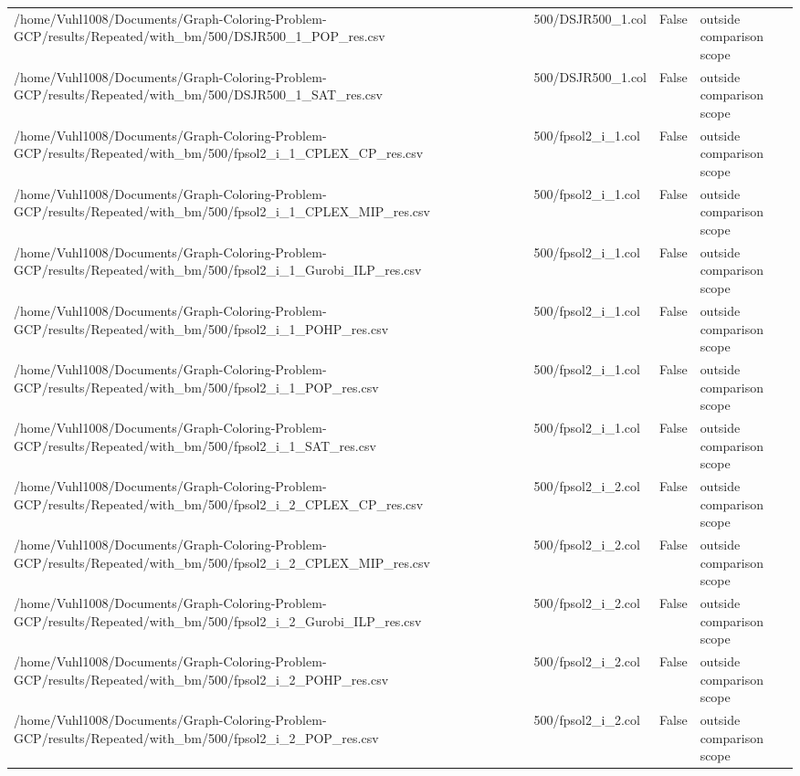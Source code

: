 \begin{table}[htbp]
\begin{tabular}{llll}
/home/Vuhl1008/Documents/Graph-Coloring-Problem-GCP/results/Repeated/with\_bm/500/DSJR500\_1\_POP\_res.csv & 500/DSJR500\_1.col & False & outside comparison scope \\
/home/Vuhl1008/Documents/Graph-Coloring-Problem-GCP/results/Repeated/with\_bm/500/DSJR500\_1\_SAT\_res.csv & 500/DSJR500\_1.col & False & outside comparison scope \\
/home/Vuhl1008/Documents/Graph-Coloring-Problem-GCP/results/Repeated/with\_bm/500/fpsol2\_i\_1\_CPLEX\_CP\_res.csv & 500/fpsol2\_i\_1.col & False & outside comparison scope \\
/home/Vuhl1008/Documents/Graph-Coloring-Problem-GCP/results/Repeated/with\_bm/500/fpsol2\_i\_1\_CPLEX\_MIP\_res.csv & 500/fpsol2\_i\_1.col & False & outside comparison scope \\
/home/Vuhl1008/Documents/Graph-Coloring-Problem-GCP/results/Repeated/with\_bm/500/fpsol2\_i\_1\_Gurobi\_ILP\_res.csv & 500/fpsol2\_i\_1.col & False & outside comparison scope \\
/home/Vuhl1008/Documents/Graph-Coloring-Problem-GCP/results/Repeated/with\_bm/500/fpsol2\_i\_1\_POHP\_res.csv & 500/fpsol2\_i\_1.col & False & outside comparison scope \\
/home/Vuhl1008/Documents/Graph-Coloring-Problem-GCP/results/Repeated/with\_bm/500/fpsol2\_i\_1\_POP\_res.csv & 500/fpsol2\_i\_1.col & False & outside comparison scope \\
/home/Vuhl1008/Documents/Graph-Coloring-Problem-GCP/results/Repeated/with\_bm/500/fpsol2\_i\_1\_SAT\_res.csv & 500/fpsol2\_i\_1.col & False & outside comparison scope \\
/home/Vuhl1008/Documents/Graph-Coloring-Problem-GCP/results/Repeated/with\_bm/500/fpsol2\_i\_2\_CPLEX\_CP\_res.csv & 500/fpsol2\_i\_2.col & False & outside comparison scope \\
/home/Vuhl1008/Documents/Graph-Coloring-Problem-GCP/results/Repeated/with\_bm/500/fpsol2\_i\_2\_CPLEX\_MIP\_res.csv & 500/fpsol2\_i\_2.col & False & outside comparison scope \\
/home/Vuhl1008/Documents/Graph-Coloring-Problem-GCP/results/Repeated/with\_bm/500/fpsol2\_i\_2\_Gurobi\_ILP\_res.csv & 500/fpsol2\_i\_2.col & False & outside comparison scope \\
/home/Vuhl1008/Documents/Graph-Coloring-Problem-GCP/results/Repeated/with\_bm/500/fpsol2\_i\_2\_POHP\_res.csv & 500/fpsol2\_i\_2.col & False & outside comparison scope \\
/home/Vuhl1008/Documents/Graph-Coloring-Problem-GCP/results/Repeated/with\_bm/500/fpsol2\_i\_2\_POP\_res.csv & 500/fpsol2\_i\_2.col & False & outside comparison scope \\

\end{tabular}
\end{table}
